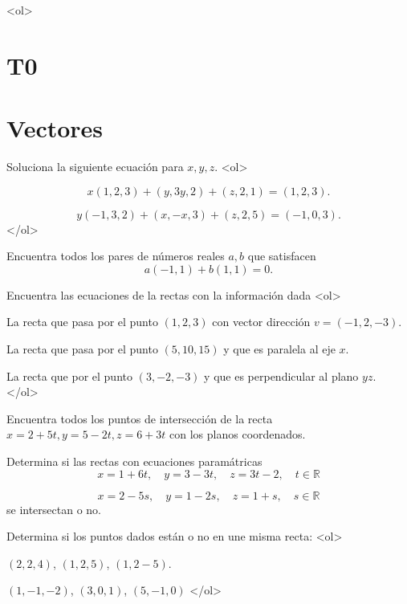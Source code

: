 \documentclass{article}
\theoremstyle{definition}
\begin{document}
<ol>


  \section*{T0}

\section*{Vectores}


    
 \item Soluciona la siguiente ecuación para $x,y,z$.
    <ol>
    \item
      $$
      x(1,2,3)+(y,3y,2)+(z,2,1)=(1,2,3).
     $$
    \item
      $$
     y(-1,3,2)+(x,-x,3)+(z,2,5)=(-1,0,3).
      $$
    </ol>

  \item Encuentra todos los pares de números reales $a,b$ que satisfacen
    $$
    a(-1,1)+b(1,1)=0.
    $$



  \item Encuentra las ecuaciones de la rectas con la información dada
    <ol>
    \item La recta que pasa por el punto $(1,2,3)$ con vector dirección $v=(-1,2,-3)$.
    \item La recta que pasa por el punto $(5,10,15)$ y que es paralela al eje $x$.
      \item La recta que por el punto $(3,-2,-3)$ y que es perpendicular al plano $yz$.
    </ol>
    
    \item Encuentra todos los puntos de intersección de la recta $x=2+5t,y=5-2t,z=6+3t$ con los planos coordenados.

      
    \item Determina si las rectas con ecuaciones paramátricas
      $$
      x=1+6t, \quad y=3-3t, \quad z=3t-2, \quad t\in \mathbb{R}
      $$
      
      $$
      x=2-5s, \quad y=1-2s,\quad z=1+s, \quad s \in \mathbb{R}
      $$
      se intersectan o no.
 

    \item Determina si los puntos dados están  o no en une misma recta:
      <ol>
      \item $(2,2,4)$, $(1,2,5)$, $(1,2-5)$.
      \item $(1,-1,-2)$, $(3,0,1)$, $(5,-1,0)$
      </ol>
          
\end{document}
